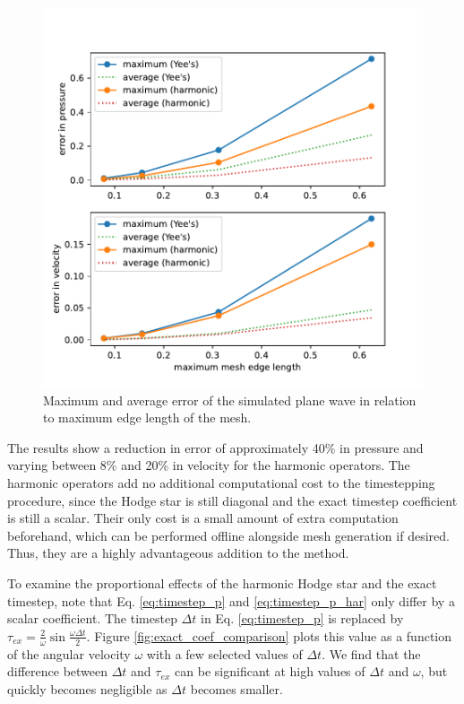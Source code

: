 \documentclass[utf8,english]{gradu3}
\begin{document}
\begin{figure}[h]
  \centering
  \includegraphics[width=350pt]{thesis/accuracy_test_errors.pdf}
  \caption{Maximum and average error of the simulated plane wave
  in relation to maximum edge length of the mesh.}
  \label{fig:accuracy_test_errors}
\end{figure}

The results show a reduction in error of approximately 40\% in pressure
and varying between 8\% and 20\% in velocity for the harmonic operators.
The harmonic operators add no additional computational cost to the timestepping procedure,
since the Hodge star is still diagonal and the exact timestep coefficient is still a scalar.
Their only cost is a small amount of extra computation beforehand,
which can be performed offline alongside mesh generation if desired.
Thus, they are a highly advantageous addition to the method.

To examine the proportional effects of the harmonic Hodge star and the exact timestep,
note that Eq. \eqref{eq:timestep_p} and \eqref{eq:timestep_p_har}
only differ by a scalar coefficient.
The timestep $\Delta t$ in Eq. \eqref{eq:timestep_p} is replaced by
$\tau_{ex} = \frac{2}{\omega} \sin \frac{\omega \Delta t}{2}$.
Figure \ref{fig:exact_coef_comparison} plots this value
as a function of the angular velocity $\omega$
with a few selected values of $\Delta t$.
We find that the difference between $\Delta t$ and $\tau_{ex}$
can be significant at high values of $\Delta t$ and $\omega$,
but quickly becomes negligible as $\Delta t$ becomes smaller.
\end{document}
